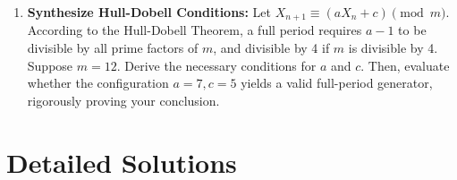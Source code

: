 \documentclass{article}
\begin{document}
\begin{enumerate}
    \item \textbf{Synthesize Hull-Dobell Conditions:} Let $X_{n+1} \equiv (aX_n + c) \pmod m$. According to the Hull-Dobell Theorem, a full period requires $a-1$ to be divisible by all prime factors of $m$, and divisible by 4 if $m$ is divisible by 4. Suppose $m=12$. Derive the necessary conditions for $a$ and $c$. Then, evaluate whether the configuration $a=7, c=5$ yields a valid full-period generator, rigorously proving your conclusion.
\end{enumerate}

\newpage

\section{Detailed Solutions}
\label{sec:solutions}
\end{document}
